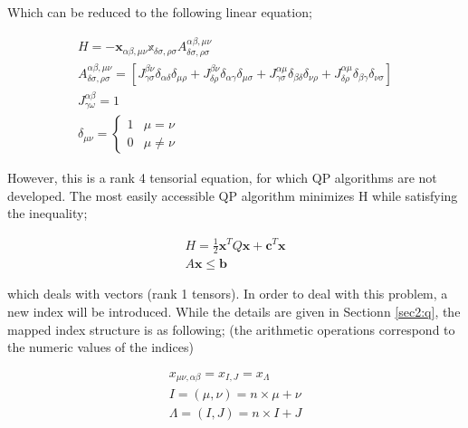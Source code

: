 \documentclass[%
 reprint,
 amsmath,amssymb,
 aps,
]{revtex4-1}
\begin{document}
Which can be reduced to the following linear equation;

\begin{equation}
	\begin{gathered}
		H = - \mathbf{x}_{\alpha\beta,\mu\nu}\mathbb{x}_{\delta\sigma,\rho\sigma} A^{\alpha\beta,\mu\nu}_{\delta\sigma,\rho\sigma} \\
		A^{\alpha\beta,\mu\nu}_{\delta\sigma,\rho\sigma} = \left[ J^{\beta\nu}_{\gamma\sigma}\delta_{\alpha\delta}\delta_{\mu\rho} + J^{\beta\nu}_{\delta\rho}\delta_{\alpha\gamma}\delta_{\mu\sigma} + J^{\alpha\mu}_{\gamma\sigma}\delta_{\beta\delta}\delta_{\nu\rho} + J^{\alpha\mu}_{\delta\rho}\delta_{\beta\gamma}\delta_{\nu\sigma} \right] \\
		J^{\alpha\beta}_{\gamma\omega} = 1 \\
		\delta_{\mu\nu} = 
		\begin{cases}
			1 & \mu = \nu \\
			0 & \mu \neq \nu
		\end{cases}
	\end{gathered}
\end{equation}

However, this is a rank 4 tensorial equation, for which QP algorithms are not developed. The most easily accessible QP algorithm minimizes H while satisfying the inequality;

\begin{equation}
	\begin{aligned}
		H = \frac{1}{2} \mathbf{x}^T Q \mathbf{x} + \mathbf{c}^T \mathbf{x} \\
		A \mathbf{x} \leq \mathbf{b}
	\end{aligned}
\end{equation}

which deals with vectors (rank 1 tensors). In order to deal with this problem, a new index will be introduced. While the details are given in Sectionn \ref{sec2:q}, the mapped index structure is as following; (the arithmetic operations correspond to the numeric values of the indices)

\begin{equation}
	\begin{gathered}
		x_{\mu\nu,\alpha\beta} = x_{I,J} = x_{\Lambda} \\
		I = (\mu ,\nu ) = n \times \mu + \nu \\
		\Lambda = (I, J) = n \times I + J 
	\end{gathered}
\end{equation}
\end{document}
